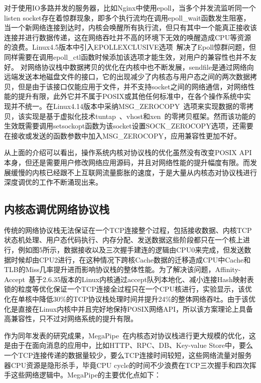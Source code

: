 对于使用IO多路并发的服务器，比如Nginx中使用epoll，当多个并发流监听同一个listen socket存在着惊群现象，即多个执行流均在调用epoll\_wait函数发生阻塞，当一个新网络连接到达时，内核会唤醒所有执行流，但只有其中一个能真正接收该连接并进行数据传递，这在网络吞吐并不高的环境下无效的唤醒造成CPU等资源的浪费。Linux4.5版本中引入EPOLLEXCLUSIVE选项~\cite{EPOLLEXCLUSIVE}解决了Epoll惊群问题，但同样需要在调用epoll\_ctl函数时候添加该选项才能生效，对用户的兼容性也并不友好。
对网络协议栈中数据拷贝的优化在内核中也不断发展，sendfile是通过网络向远端发送本地磁盘文件的接口，它的出现减少了内核态与用户态之间的两次数据拷贝，但是由于该接口仅能应用于文件，并不支持socket之间的网络通信，对网络性能的提升有限，此外它并不属于POSIX或其他任何标准中，在各个操作系统中实现并不统一。在Linux4.14版本中采纳MSG\_ZEROCOPY~\cite{msg_zerocopy}选项来实现数据的零拷贝，该实现是基于虚拟化技术tuntap~\cite{tuntap}、vhost和xen~\cite{Xen}的零拷贝框架。然而该功能的生效既需要调用setsockopt函数为该socket设置SOCK\_ZEROCOPY选项，还需要在接收或发送的函数参数中加入MSG\_ZEROCOPY，应用兼容性更加不好。

从上面的介绍可以看出，操作系统内核对协议栈的优化虽然没有改变POSIX API本身，但还是需要用户修改网络应用源码，并且对网络性能的提升幅度有限。而发展缓慢的内核已经跟不上互联网流量膨胀的速度，于是大量从内核态对协议栈进行深度调优的工作不断涌现出来。

\subsection{内核态调优网络协议栈}

传统的网络协议栈无法保证在一个TCP连接整个过程，包括接收数据、内核TCP状态机处理、用户态代码执行、内存分配、发送数据这些阶段都只在一个核上进行，例如图5所示，数据接收以及三次握手建连的逻辑由CPU0来完成，但发送数据时候却由CPU2进行，在这种情况下跨核Cache数据的迁移造成CPU中Cache和TLB的Miss几率提升进而影响协议栈的整体性能。为了解决该问题，Affinity-Accept~\cite{Affinity-Accept}基于2.6.35版本的Linux内核通过accept队列本地化、减小连接Hash映射表锁的粒度等优化保证一个TCP连接全过程只在一个CPU核进行，实验显示，该优化在单核中降低30\%的TCP协议栈处理时间并提升24\%的整体网络吞吐。由于该优化是直接在Linux内核中并且完好地保持POSIX网络API，所以该方案理论上具备高兼容性，只不过对网络系统的提升有限。

作为同年发表的研究成果，MegaPipe~\cite{MegaPipe}在内核态对协议栈进行更大规模的优化，这是由于在面向消息的应用中，比如HTTP、RPC、DB、Key-value Store中，要么一个TCP连接传递的数据量较少，要么TCP连接时间较短，这些网络流量对服务器CPU资源是隐形杀手，毕竟CPU cycle的时间不少浪费在TCP三次握手和四次挥手这些网络逻辑中。MegaPipe的主要优化点如下：

